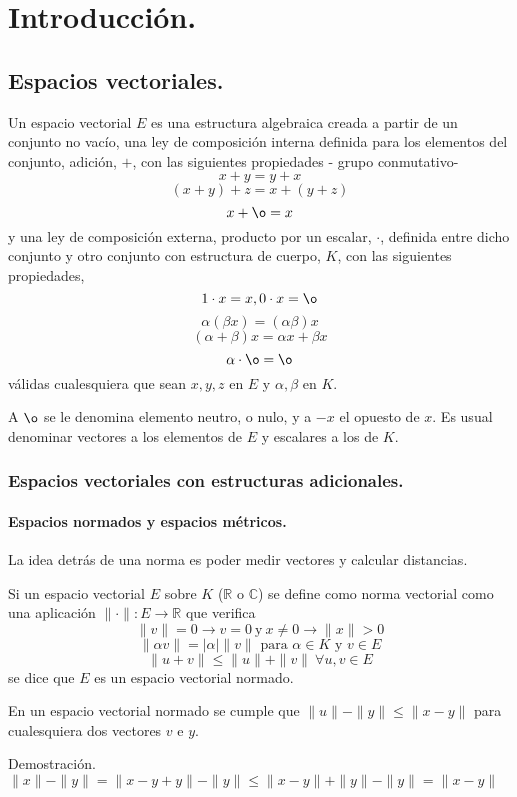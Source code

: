 \chapter{Introducción.}
\section{Espacios vectoriales.}
Un espacio vectorial $E$ es una estructura algebraica creada a partir de un conjunto no vacío, una ley de composición interna definida para los elementos del conjunto, adición, $+$, con las siguientes propiedades - grupo conmutativo- 
\[ x + y = y + x \]
\[ (x + y) + z = x + (y + z) \]
\[ x + \o = x \]
y una ley de composición externa, producto por un escalar, $\cdot$, definida entre dicho conjunto y otro conjunto con estructura de cuerpo, $K$, con las siguientes propiedades,
\[ 1 \cdot x = x, 0 \cdot x = \o \]
\[ \alpha(\beta x) = (\alpha \beta)x \]
\[ (\alpha + \beta) x = \alpha x + \beta x \]
\[ \alpha \cdot \o = \o \]
válidas cualesquiera que sean $x, y, z$ en $E$ y $\alpha, \beta$ en $K$.

A $\o$ se le denomina elemento neutro, o nulo, y a $-x$ el opuesto de $x$. Es usual denominar vectores a los elementos de $E$ y escalares a los de $K$.

\subsection{Espacios vectoriales con estructuras adicionales.}
\subsubsection{Espacios normados y espacios métricos.}
La idea detrás de una norma es poder medir vectores y calcular distancias.

Si un espacio vectorial $E$ sobre $K$ ($\mathbb{R}$ o $\mathbb{C}$) se define como norma vectorial como una aplicación $\| \cdot \|:E \rightarrow \mathbb{R}$ que verifica
\[ \|v\| = 0 \rightarrow v = 0\ \text{y} \ x \neq 0 \rightarrow \|x\| > 0 \]
\[ \|\alpha v\| = |\alpha| \|v\| \text{ para } \alpha \in K \text{ y } v \in E \]
\[ \|u + v\| \leq \|u\| + \|v\| \ \forall u,v \in E \]
se dice que $E$ es un espacio vectorial normado.

En un espacio vectorial normado se cumple que $\|u\| - \|y\| \leq \|x - y \|$ para cualesquiera dos vectores $v$ e $y$.

Demostración. $\|x\| - \|y\| = \|x - y + y\| - \|y\| \leq \|x - y\| + \|y\| - \|y\| = \|x - y\|$

